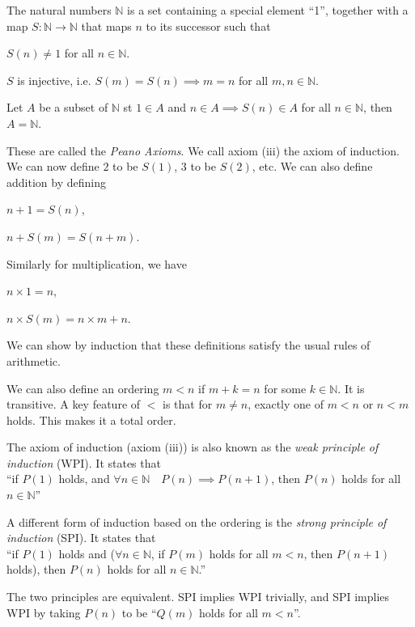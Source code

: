\documentclass[12pt]{article}
\begin{document}
The natural numbers $\mathbb{N}$ is a set containing
a special element ``1'', together with a map
$S: \mathbb{N} \to \mathbb{N}$ that maps $n$ to its successor such that
\begin{compactenum}[(i)]
\item $S(n) \ne 1$ for all $n \in \mathbb{N}$.
\item $S$ is injective, i.e. $S(m) = S(n) \implies m = n$ for all $m,n \in \mathbb{N}$.
\item Let $A$ be a subset of $\mathbb{N}$ st $1 \in A$ and 
    $n \in A \implies S(n) \in A$ for all $n \in \mathbb{N}$,
    then $A = \mathbb{N}$.
\end{compactenum}
These are called the \emph{Peano Axioms}.
We call axiom (iii) the axiom of induction.
We can now define $2$ to be $S(1)$, $3$ to be $S(2)$, etc.
We can also define addition by defining
\begin{compactitem}
\item $n+1 = S(n)$,
\item $n + S(m) = S(n + m)$.
\end{compactitem}
Similarly for multiplication, we have
\begin{compactitem}
\item $n \times 1 = n$,
\item $n \times S(m) = n \times m + n$.
\end{compactitem}

We can show by induction that these definitions
satisfy the usual rules of arithmetic.

We can also define an ordering $m < n$ if $m + k = n$
for some $k \in \mathbb{N}$. It is transitive.
A key feature of $<$ is that for $m \ne n$,
exactly one of $m < n$ or $n < m$ holds.
This makes it a total order.

The axiom of induction (axiom (iii))
is also known as the \emph{weak principle of induction} (WPI).
It states that \\
``if $P(1)$ holds, and $\forall n \in \mathbb{N} \quad P(n) \implies P(n+1)$,
then $P(n)$ holds for all $n \in \mathbb{N}$''

A different form of induction based on the ordering
is the \emph{strong principle of induction} (SPI). It states that\\
``if $P(1)$ holds and ($\forall n \in \mathbb{N}$, if
$P(m)$ holds for all $m < n$, then $P(n+1)$ holds),
then $P(n)$ holds for all $n \in \mathbb{N}$.''

The two principles are equivalent.
SPI implies WPI trivially,
and SPI implies WPI by taking $P(n)$ to be
``$Q(m)$ holds for all $m < n$''.
\end{document}
